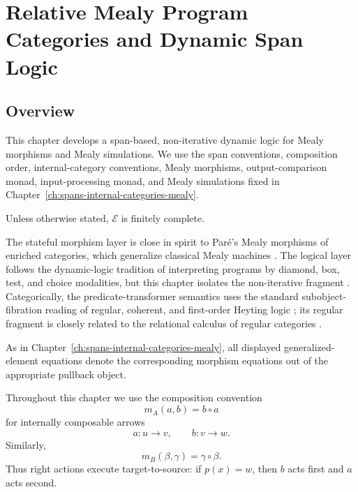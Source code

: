 \chapter{Relative Mealy Program Categories and Dynamic Span Logic}
\label{ch:relative-mealy-program-categories}

\section{Overview}
\label{sec:relative-mealy-overview}

This chapter develops a span-based, non-iterative dynamic logic for Mealy
morphisms and Mealy simulations. We use the span conventions, composition
order, internal-category conventions, Mealy morphisms, output-comparison
monad, input-processing monad, and Mealy simulations fixed in
Chapter~\ref{ch:spans-internal-categories-mealy}.

Unless otherwise stated, \(\mathcal E\) is finitely complete.

The stateful morphism layer is close in spirit to Paré's Mealy morphisms of
enriched categories, which generalize classical Mealy machines
\cite{PareMealyMorphisms}. The logical layer follows the dynamic-logic
tradition of interpreting programs by diamond, box, test, and choice
modalities, but this chapter isolates the non-iterative fragment
\cite{HarelKozenTiurynDynamicLogic}. Categorically, the predicate-transformer
semantics uses the standard subobject-fibration reading of regular, coherent,
and first-order Heyting logic
\cite{Jacobs1999CategoricalLogic}; its regular fragment is closely related to
the relational calculus of regular categories
\cite{FongSpivakRegularRelational}.

As in Chapter~\ref{ch:spans-internal-categories-mealy}, all displayed
generalized-element equations denote the corresponding morphism equations out
of the appropriate pullback object.

Throughout this chapter we use the composition convention
\[
m_A(a,b)=b\circ a
\]
for internally composable arrows
\[
a:u\to v,
\qquad
b:v\to w.
\]
Similarly,
\[
m_B(\beta,\gamma)=\gamma\circ\beta.
\]
Thus right actions execute target-to-source: if \(p(x)=w\), then \(b\) acts
first and \(a\) acts second.

